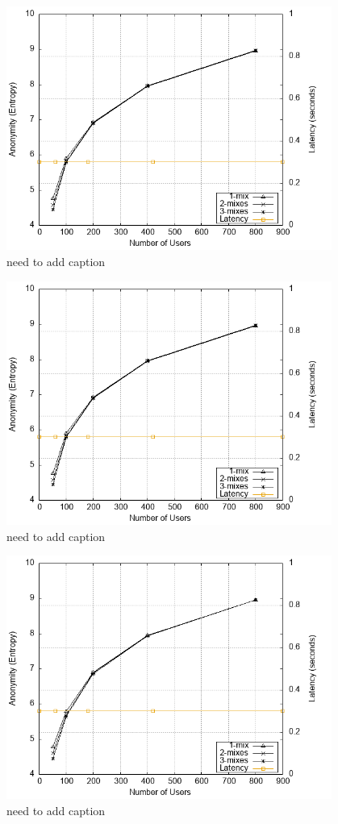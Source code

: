 \documentclass[logo,msc,cyber]{infthesis}   %
\begin{document}
\begin{figure}[h!]
    \centering
    \includegraphics[height=8cm]{figures/simulator_extentions/first_layer_variable.png}
    \caption{need to add caption}
    \label{fig:first-layer-variable}
\end{figure} 

\begin{figure}[h!]
    \centering
    \includegraphics[height=8cm]{figures/simulator_extentions/first_layer_variable.png}
    \caption{need to add caption}
    \label{fig:first-layer-variable}
\end{figure} 

\begin{figure}[h!]
    \centering
    \includegraphics[height=8cm]{figures/simulator_extentions/middle_layer_variable.png}
    \caption{need to add caption}
    \label{fig:middle-layer-variable}
\end{figure} 
\end{document}
